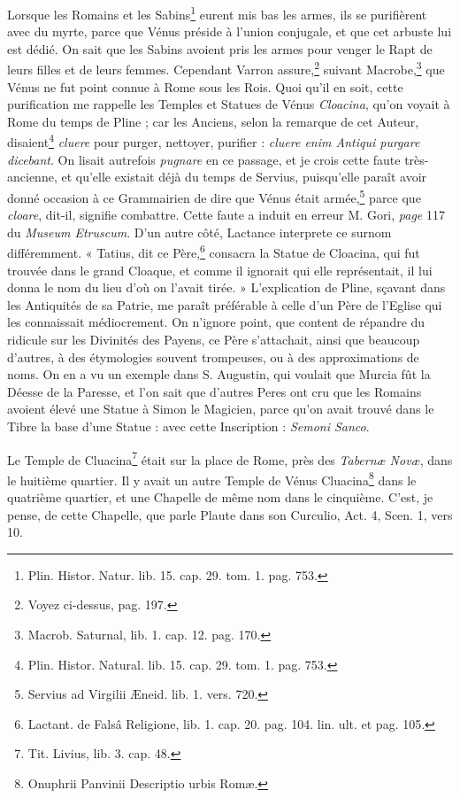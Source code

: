 \documentclass[a4paper, 11pt, oneside, polutonikogreek, french]{article}
\begin{document}
Lorsque les Romains et les Sabins\footnote{Plin. Histor. Natur. lib. 15. cap. 29. tom. 1. pag. 753.} eurent mis bas les armes, ils se purifièrent avec du myrte, parce que Vénus préside à l'union conjugale, et que cet arbuste lui est dédié. On sait que les Sabins avoient pris les armes pour venger le Rapt de leurs filles et de leurs femmes. Cependant Varron assure,\footnote{Voyez ci-dessus, pag. 197.} suivant Macrobe,\footnote{Macrob. Saturnal, lib. 1. cap. 12. pag. 170.} que Vénus ne fut point connue à Rome sous les Rois. Quoi qu'il en soit, cette purification me rappelle les Temples et Statues de Vénus \emph{Cloacina}, qu'on voyait à Rome du temps de Pline ; car les Anciens, selon la remarque de cet Auteur, disaient\footnote{Plin. Histor. Natural. lib. 15. cap. 29. tom. 1. pag. 753.} \emph{cluere} pour purger, nettoyer, purifier : \emph{cluere enim Antiqui purgare dicebant}. On lisait autrefois \emph{pugnare} en ce passage, et je crois cette faute très-ancienne, et qu'elle existait déjà du temps de Servius, puisqu'elle paraît avoir donné occasion à ce Grammairien de dire que Vénus était armée,\footnote{Servius ad Virgilii Æneid. lib. 1. vers. 720.} parce que \emph{cloare}, dit-il, signifie combattre. Cette faute a induit en erreur M. Gori, \emph{page} 117 du \emph{Museum Etruscum}. D'un autre côté, Lactance interprete ce surnom différemment. « Tatius, dit ce Père,\footnote{Lactant. de Falsâ Religione, lib. 1. cap. 20. pag. 104. lin. ult. et pag. 105.} consacra la Statue de Cloacina, qui fut trouvée dans le grand Cloaque, et comme il ignorait qui elle représentait, il lui donna le nom du lieu d'où on l'avait tirée. » L'explication de Pline, sçavant dans les Antiquités de sa Patrie, me paraît préférable à celle d'un Père de l'Eglise qui les connaissait médiocrement. On n'ignore point, que content de répandre du ridicule sur les Divinités des Payens, ce Père s'attachait, ainsi que beaucoup d'autres, à des étymologies souvent trompeuses, ou à des approximations de noms. On en a vu un exemple dans S. Augustin, qui voulait que Murcia fût la Déesse de la Paresse, et l'on sait que d'autres Peres ont cru que les Romains avoient élevé une Statue à Simon le Magicien, parce qu'on avait trouvé dans le Tibre la base d'une Statue : avec cette Inscription : \emph{Semoni Sanco}.

Le Temple de Cluacina\footnote{Tit. Livius, lib. 3. cap. 48.} était sur la place de Rome, près des \emph{Tabernæ Novæ}, dans le huitième quartier. Il y avait un autre Temple de Vénus Cluacina\footnote{Onuphrii Panvinii Descriptio urbis Romæ.} dans le quatrième quartier, et une Chapelle de même nom dans le cinquième. C'est, je pense, de cette Chapelle, que parle Plaute dans son Curculio, Act. 4, Scen. 1, vers 10.
\end{document}
